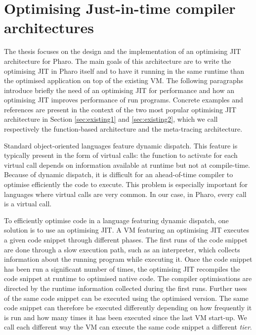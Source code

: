\documentclass[a4paper,12pt,twoside]{../includes/ThesisStyle}
\begin{document}
\fi

\chapter{Optimising Just-in-time compiler architectures}
\label{chap:stateOfTheArt}
\minitoc

The thesis focuses on the design and the implementation of an optimising JIT architecture for Pharo. The main goals of this architecture are to write the optimising JIT in Pharo itself and to have it running in the same runtime than the optimised application on top of the existing VM. The following paragraphs introduce briefly the need of an optimising JIT for performance and how an optimising JIT improves performance of run programs. Concrete examples and references are present in the context of the two most popular optimising JIT architecture in Section \ref{sec:existing1} and \ref{sec:existing2}, which we call respectively the function-based architecture and the meta-tracing architecture.

Standard object-oriented languages feature dynamic dispatch. This feature is typically present in the form of virtual calls: the function to activate for each virtual call depends on information available at runtime but not at compile-time. Because of dynamic dispatch, it is difficult for an ahead-of-time compiler to optimise efficiently the code to execute. This problem is especially important for languages where virtual calls are very common. In our case, in Pharo, every call is a virtual call.

To efficiently optimise code in a language featuring dynamic dispatch, one solution is to use an optimising JIT. A VM featuring an optimising JIT executes a given code snippet through different phases. The first runs of the code snippet are done through a slow execution path, such as an interpreter, which collects information about the running program while executing it. Once the code snippet has been run a significant number of times, the optimising JIT recompiles the code snippet at runtime to optimised native code. The compiler optimisations are directed by the runtime information collected during the first runs. Further uses of the same code snippet can be executed using the optimised version. The same code snippet can therefore be executed differently depending on how frequently it is run and how many times it has been executed since the last VM start-up. We call each different way the VM can execute the same code snippet a different \emph{tier}.
\end{document}

